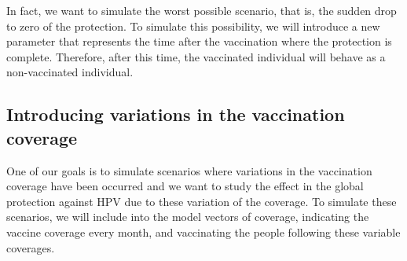 In fact, we want to simulate the worst possible scenario, that is, the sudden drop to zero of the protection. To simulate this possibility, we will introduce a new parameter that represents the time after the vaccination where the protection is complete. Therefore, after this time, the vaccinated individual will behave as a non-vaccinated individual.

\subsection{Introducing variations in the vaccination coverage}
One of our goals is to simulate scenarios where variations in the vaccination coverage have been occurred and we want to study the effect in the global protection against HPV due to these variation of the coverage. To simulate these scenarios, we will include into the model vectors of coverage, indicating the vaccine coverage every month, and vaccinating the people following these variable coverages. 
